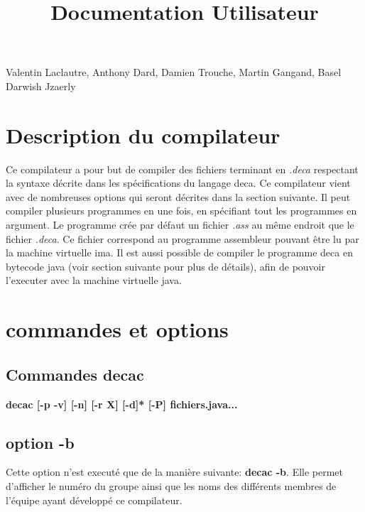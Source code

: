 \documentclass[12pt, a4paper, one side]{article}
\title{Documentation Utilisateur}
\author{}
\date{}
\begin{document}
\maketitle

\begin{center}
    Valentin Laclautre, Anthony Dard, Damien Trouche, Martin Gangand, Basel Darwish Jzaerly
\end{center}

\tableofcontents

\newpage

\section{Description du compilateur}

Ce compilateur a pour but de compiler des fichiers terminant en \textit{.deca}
respectant la syntaxe décrite dans les spécifications du langage deca. Ce compilateur
vient avec de nombreuses options qui seront décrites dans la section suivante. Il
peut compiler plusieurs programmes en une fois, en spécifiant tout les programmes
en argument. Le programme crée par défaut un fichier \textit{.ass} au même endroit que
le fichier \textit{.deca}. Ce fichier correspond au programme assembleur pouvant être lu
par la machine virtuelle ima. Il est aussi possible de compiler le programme deca en
bytecode java (voir section suivante pour plus de détails), afin de pouvoir l'executer
avec la machine virtuelle java.

\section{commandes et options}

\subsection{Commandes decac}

\textbf{decac [-p \textbar -v] [-n] [-r X] [-d]* [-P] fichiers.java... \textbar [-b]}

\subsection{option -b}

Cette option n'est executé que de la manière suivante: \textbf{decac -b}. Elle permet
d'afficher le numéro du groupe ainsi que les noms des différents membres de l'équipe
ayant développé ce compilateur.
\end{document}
